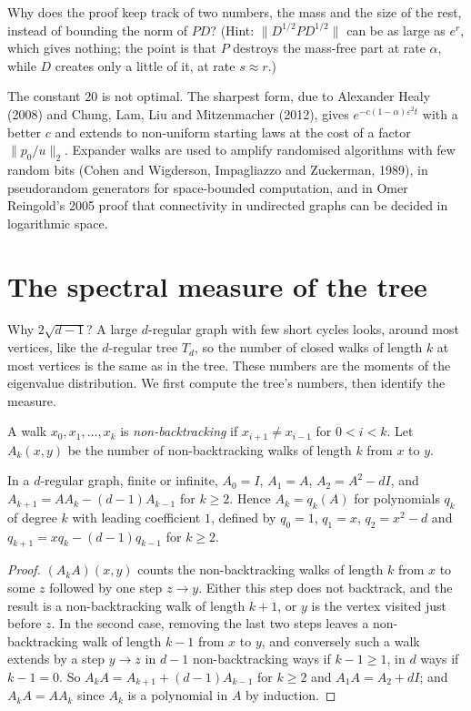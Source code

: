 \begin{think}
Why does the proof keep track of two numbers, the mass and the size of the rest, instead of bounding the norm of $PD$? (Hint: $\|D^{1/2}PD^{1/2}\|$ can be as large as $e^r$, which gives nothing; the point is that $P$
destroys the mass-free part at rate $\alpha$, while $D$ creates only a little of it, at rate $s\approx r$.)
\end{think}

\begin{remark}
The constant $20$ is not optimal. The sharpest form, due to Alexander Healy (2008) and Chung, Lam, Liu and Mitzenmacher (2012), gives $e^{-c(1-\alpha)\varepsilon^2t}$ with a better $c$ and extends to non-uniform starting laws
at the cost of a factor $\|p_0/u\|_2$. Expander walks are used to amplify randomised algorithms with few random bits (Cohen and Wigderson, Impagliazzo and Zuckerman, 1989), in pseudorandom generators for space-bounded
computation, and in Omer Reingold's 2005 proof that connectivity in undirected graphs can be decided in logarithmic space.
\end{remark}

\section{The spectral measure of the tree}

Why $2\sqrt{d-1}$? A large $d$-regular graph with few short cycles looks, around most vertices, like the $d$-regular tree $T_d$, so the number of closed walks of length $k$ at most vertices is the same as in the tree.
These numbers are the moments of the eigenvalue distribution. We first compute the tree's numbers, then identify the measure.

A walk $x_0,x_1,\dots,x_k$ is \emph{non-backtracking} if $x_{i+1}\ne x_{i-1}$ for $0<i<k$. Let $A_k(x,y)$ be the number of non-backtracking walks of length $k$ from $x$ to $y$.

\begin{lemma}\label{lem:nbpoly}
In a $d$-regular graph, finite or infinite, $A_0=I$, $A_1=A$, $A_2=A^2-dI$, and $A_{k+1}=AA_k-(d-1)A_{k-1}$ for $k\ge2$. Hence $A_k=q_k(A)$ for polynomials $q_k$ of degree $k$ with leading coefficient $1$, defined by $q_0=1$,
$q_1=x$, $q_2=x^2-d$ and $q_{k+1}=xq_k-(d-1)q_{k-1}$ for $k\ge2$.
\end{lemma}

\begin{proof}
$(A_kA)(x,y)$ counts the non-backtracking walks of length $k$ from $x$ to some $z$ followed by one step $z\to y$. Either this step does not backtrack, and the result is a non-backtracking walk of length $k+1$, or
$y$ is the vertex visited just before $z$. In the second case, removing the last two steps leaves a non-backtracking walk of length $k-1$ from $x$ to $y$, and conversely such a walk extends by a step $y\to z$ in $d-1$
non-backtracking ways if $k-1\ge1$, in $d$ ways if $k-1=0$. So $A_kA=A_{k+1}+(d-1)A_{k-1}$ for $k\ge2$ and $A_1A=A_2+dI$; and $A_kA=AA_k$ since $A_k$ is a polynomial in $A$ by induction.
\end{proof}

